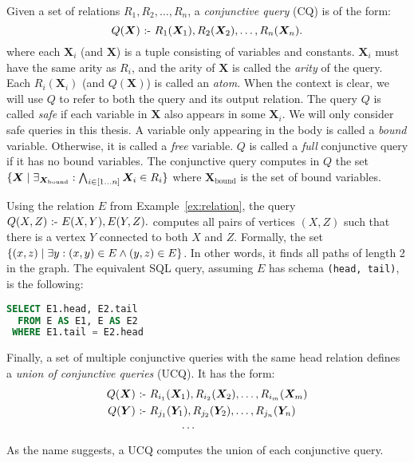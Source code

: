Given a set of relations $R_1, R_2, \ldots, R_n$, 
 a {\em conjunctive query} (CQ) is of the form:
\[
  Q(\bm{X}) \text{ :- } R_1(\bm{X}_1), R_2(\bm{X}_2), \ldots, R_n(\bm{X}_n).
\]
where each $\bm{X}_i$ (and $\bm{X}$) is a tuple consisting of variables and constants.
$\bm{X}_i$ must have the same arity as $R_i$,
 and the arity of $\bm{X}$ is called the {\em arity} of the query.
Each $R_i({\bm X_i})$ (and $Q({\bm X})$) is called an {\em atom}.
When the context is clear, 
 we will use $Q$ to refer to both the query and its output relation.
The query $Q$ is called {\em safe} if each variable in $\bm{X}$ also appears in some $\bm{X}_i$.
We will only consider safe queries in this thesis.
A variable only appearing in the body is called a {\em bound} variable.
Otherwise, it is called a {\em free} variable. 
$Q$ is called a {\em full} conjunctive query if it has no bound variables.
The conjunctive query computes in $Q$ the set 
 $\{{\bm X}\mid{\exists_{\bm X_\text{bound}} : \bigwedge_{i \in [1 \ldots n]} {\bm X_i} \in R_i}\}$
 where ${\bm X_\text{bound}}$ is the set of bound variables.

\begin{ex}
\label{ex:cq}
Using the relation $E$ from Example~\ref{ex:relation},
 the query $Q(X, Z) \text{ :- } E(X, Y), E(Y, Z).$
 computes all pairs of vertices $(X, Z)$ 
 such that there is a vertex $Y$ 
 connected to both $X$ and $Z$.
Formally, the set $\{{(x, z)}\mid{\exists y : (x, y) \in E \wedge (y, z) \in E}\}$.
In other words, it finds all paths of length 2 in the graph.
The equivalent SQL query, assuming $E$ has schema \texttt{(head, tail)}, is the following:
\begin{lstlisting}[language=SQL]
SELECT E1.head, E2.tail
  FROM E AS E1, E AS E2
 WHERE E1.tail = E2.head
\end{lstlisting}
\end{ex}

Finally, a set of multiple conjunctive queries with the same head relation
 defines a {\em union of conjunctive queries} (UCQ).
It has the form:
\begin{align*}
  Q(\bm{X}) & \text{ :- } R_{i_1}(\bm{X}_1), R_{i_2}(\bm{X}_2), \ldots, R_{i_m}(\bm{X}_m) \\
  Q(\bm{Y}) & \text{ :- } R_{j_1}(\bm{Y}_1), R_{j_2}(\bm{Y}_2), \ldots, R_{j_n}(\bm{Y}_n) \\
  & \hspace{4em} \cdots
\end{align*}
As the name suggests, a UCQ computes the union of each conjunctive query.

